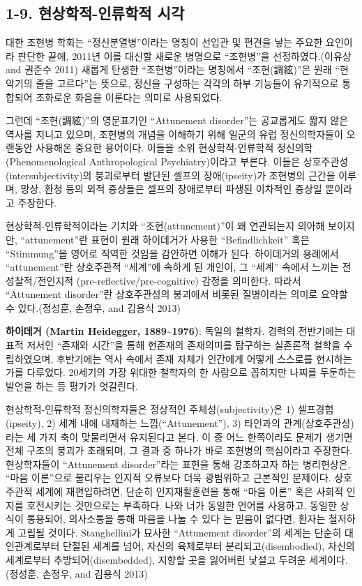 \documentclass[
]{article}
\begin{document}
\hypertarget{uxd604uxc0c1uxd559uxc801-uxc778uxb958uxd559uxc801-uxc2dcuxac01}{%
\subsection{1-9. 현상학적-인류학적
시각}\label{uxd604uxc0c1uxd559uxc801-uxc778uxb958uxd559uxc801-uxc2dcuxac01}}

대한 조현병 학회는 ``정신분열병''이라는 명칭이 선입관 및 편견을 낳는
주요한 요인이라 판단한 끝에, 2011년 이를 대신할 새로운 병명으로
``조현병''을 선정하였다.(이유상 and 권준수 2011) 새롭게 탄생한
``조현병''이라는 명칭에서 ``조현(調絃)''은 원래 ``현악기의 줄을
고르다''는 뜻으로, 정신을 구성하는 각각의 하부 기능들이 유기적으로
통합되어 조화로운 화음을 이룬다는 의미로 사용되었다.

그런데 ``조현(調絃)''의 영문표기인 ``Attunement disorder''는 공교롭게도
짧지 않은 역사를 지니고 있으며, 조현병의 개념을 이해하기 위해 일군의
유럽 정신의학자들이 오랜동안 사용해온 중요한 용어이다. 이들을 소위
현상학적-인류학적 정신의학(Phenomenological Anthropological
Psychiatry)이라고 부른다. 이들은 상호주관성(intersubjectivity)의
붕괴로부터 발단된 셀프의 장애(ipseity)가 조현병의 근간을 이루며, 망상,
환청 등의 외적 증상들은 셀프의 장애로부터 파생된 이차적인 증상일
뿐이라고 주장한다.

현상학적-인류학적이라는 기치와 ``조현(attunement)''이 왜 연관되는지
의아해 보이지만, ``attunement''란 표현이 원래 하이데거가 사용한
``Befindlichkeit'' 혹은 ``Stimmung''을 영어로 직역한 것임을 감안하면
이해가 된다. 하이데거의 용례에서 ``attunement''란 상호주관적 ``세계''에
속하게 된 개인이, 그 ``세계'' 속에서 느끼는 전성찰적/전인지적
(pre-reflective/pre-cognitive) 감정을 의미한다. 따라서 ``Attunement
disorder''란 상호주관성의 붕괴에서 비롯된 질병이라는 의미로 요약할 수
있다.(정성훈, 손정우, and 김용식 2013)

\textbf{하이데거 (Martin Heidegger, 1889\textasciitilde1976)}: 독일의
철학자. 경력의 전반기에는 대표적 저서인 ``존재와 시간''을 통해 현존재의
존재의미를 탐구하는 실존론적 철학을 수립하였으며, 후반기에는 역사 속에서
존재 자체가 인간에게 어떻게 스스로를 현시하는가를 다루었다. 20세기의
가장 위대한 철학자의 한 사람으로 꼽히지만 나찌를 두둔하는 발언을 하는 등
평가가 엇갈린다.

현상학적-인류학적 정신의학자들은 정상적인 주체성(subjectivity)은 1)
셀프경험(ipseity), 2) 세계 내에 내재하는 느낌(``Attunement''), 3)
타인과의 관계(상호주관성)라는 세 가지 축이 맞물리면서 유지된다고 본다.
이 중 어느 한쪽이라도 문제가 생기면 전체 구조의 붕괴가 초래되며, 그 결과
중 하나가 바로 조현병의 핵심이라고 주장한다. 현상학자들이 ``Attunement
disorder''라는 표현을 통해 강조하고자 하는 병리현상은, ``마음 이론''으로
불리우는 인지적 오류보다 더욱 광범위하고 근본적인 문제이다. 상호주관적
세계에 재편입하려면, 단순히 인지재활훈련을 통해 ``마음 이론'' 혹은
사회적 인지를 호전시키는 것만으로는 부족하다. 나와 너가 동일한 언어를
사용하고, 동일한 상식이 통용되어, 의사소통을 통해 마음을 나눌 수 있다 는
믿음이 없다면, 환자는 철저하게 고립될 것이다. Stanghellini가 묘사한
``Attunement disorder''의 세계는 단순히 대인관계로부터 단절된 세계를
넘어, 자신의 육체로부터 분리되고(disembodied), 자신의 세계로부터
추방되어(disembedded), 지향할 곳을 잃어버린 낯설고 두려운
세계이다.(정성훈, 손정우, and 김용식 2013)
\end{document}
